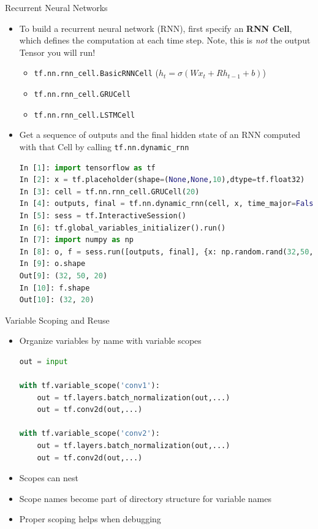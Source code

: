 \documentclass[]{beamer}
\begin{document}
\begin{frame}[fragile]{Recurrent Neural Networks}

\begin{itemize}
\item To build a recurrent neural network (RNN), first specify an \textbf{RNN Cell}, which defines the computation at each time step. Note, this is \textit{not} the output Tensor you will run!
\begin{itemize}
\item \verb|tf.nn.rnn_cell.BasicRNNCell| ($h_t = \sigma(Wx_t + Rh_{t-1}+ b)$)
\item \verb|tf.nn.rnn_cell.GRUCell|
\item \verb|tf.nn.rnn_cell.LSTMCell|
\end{itemize}
\item Get a sequence of outputs and the final hidden state of an RNN computed with that Cell by calling \verb|tf.nn.dynamic_rnn|

\lstset{style=mystyle2}
\begin{lstlisting}[language=python]
In [1]: import tensorflow as tf
In [2]: x = tf.placeholder(shape=(None,None,10),dtype=tf.float32)
In [3]: cell = tf.nn.rnn_cell.GRUCell(20)
In [4]: outputs, final = tf.nn.dynamic_rnn(cell, x, time_major=False, dtype=tf.float32)
In [5]: sess = tf.InteractiveSession()
In [6]: tf.global_variables_initializer().run()
In [7]: import numpy as np
In [8]: o, f = sess.run([outputs, final], {x: np.random.rand(32,50,10)})
In [9]: o.shape
Out[9]: (32, 50, 20)
In [10]: f.shape
Out[10]: (32, 20)

\end{lstlisting}
\lstset{style=mystyle}

\end{itemize}

\end{frame}

\begin{frame}[fragile]{Variable Scoping and Reuse}

\begin{itemize}
\item Organize variables by name with variable scopes
\begin{lstlisting}[language=python]
out = input

with tf.variable_scope('conv1'):
    out = tf.layers.batch_normalization(out,...)
    out = tf.conv2d(out,...)

with tf.variable_scope('conv2'):
    out = tf.layers.batch_normalization(out,...)
    out = tf.conv2d(out,...)

\end{lstlisting}
\item Scopes can nest
\item Scope names become part of directory structure for variable names
\item Proper scoping helps when debugging
\end{itemize}
\end{frame}
\end{document}
